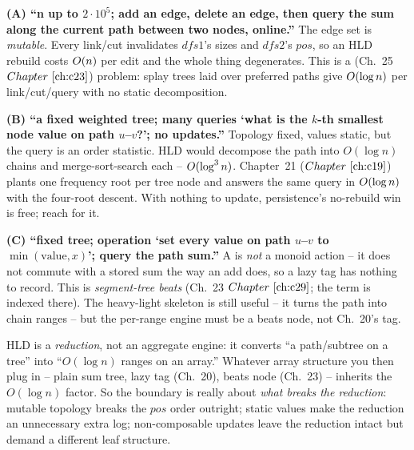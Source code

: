 \begin{comparisonbox}
\textbf{(A) ``n up to \(2\cdot10^5\); add an edge, delete an edge, then query the sum along the current path between two nodes, online.''}  The edge set is \emph{mutable}.  Every link/cut invalidates \(\mathit{dfs1}\)'s sizes and \(\mathit{dfs2}\)'s \(\mathit{pos}\), so an HLD rebuild costs \(O(n)\) per edit and the whole thing degenerates.  This is a  (Ch.~25 \(\chref{c23}\)) problem: splay trees laid over preferred paths give \(O(\log n)\) per link/cut/query with no static decomposition.

\textbf{(B) ``a fixed weighted tree; many queries `what is the \(k\)-th smallest node value on path \(u\)--\(v\)?'; no updates.''}  Topology fixed, values static, but the query is an order statistic.  HLD would decompose the path into \(O(\log n)\) chains and merge-sort-search each -- \(O(\log^3 n)\).  Chapter~21 (\(\chref{c19}\)) plants one frequency root per tree node and answers the same query in \(O(\log n)\) with the four-root descent.  With nothing to update, persistence's no-rebuild win is free; reach for it.

\textbf{(C) ``fixed tree; operation `set every value on path \(u\)--\(v\) to \(\min(\text{value},x)\)'; query the path sum.''}  A  is \emph{not} a monoid action -- it does not commute with a stored sum the way an add does, so a lazy tag has nothing to record.  This is \emph{segment-tree beats} (Ch.~23 \(\chref{c29}\); the term is indexed there).  The heavy-light skeleton is still useful -- it turns the path into chain ranges -- but the per-range engine must be a beats node, not Ch.~20's tag.
\end{comparisonbox}

\begin{observation}
HLD is a \emph{reduction}, not an aggregate engine: it converts ``a path/subtree on a tree'' into ``\(O(\log n)\) ranges on an array.''  Whatever array structure you then plug in -- plain sum tree, lazy tag (Ch.~20), beats node (Ch.~23) -- inherits the \(O(\log n)\) factor.  So the boundary is really about \emph{what breaks the reduction}: mutable topology breaks the \(\mathit{pos}\) order outright; static values make the reduction an unnecessary extra log; non-composable updates leave the reduction intact but demand a different leaf structure.
\end{observation}

